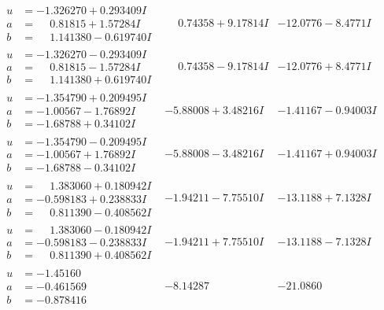 \documentclass[1p]{elsarticle_modified}
\theoremstyle{definition}
\begin{document}
$$\begin{array}{c|c|c}
\begin{aligned}
u &= -1.326270 + 0.293409 I \\
a &= \phantom{-}0.81815 + 1.57284 I \\
b &= \phantom{-}1.141380 - 0.619740 I\end{aligned}
 & \phantom{-}0.74358 + 9.17814 I & -12.0776 - 8.4771 I \\ \hline\begin{aligned}
u &= -1.326270 - 0.293409 I \\
a &= \phantom{-}0.81815 - 1.57284 I \\
b &= \phantom{-}1.141380 + 0.619740 I\end{aligned}
 & \phantom{-}0.74358 - 9.17814 I & -12.0776 + 8.4771 I \\ \hline\begin{aligned}
u &= -1.354790 + 0.209495 I \\
a &= -1.00567 - 1.76892 I \\
b &= -1.68788 + 0.34102 I\end{aligned}
 & -5.88008 + 3.48216 I & -1.41167 - 0.94003 I \\ \hline\begin{aligned}
u &= -1.354790 - 0.209495 I \\
a &= -1.00567 + 1.76892 I \\
b &= -1.68788 - 0.34102 I\end{aligned}
 & -5.88008 - 3.48216 I & -1.41167 + 0.94003 I \\ \hline\begin{aligned}
u &= \phantom{-}1.383060 + 0.180942 I \\
a &= -0.598183 + 0.238833 I \\
b &= \phantom{-}0.811390 - 0.408562 I\end{aligned}
 & -1.94211 - 7.75510 I & -13.1188 + 7.1328 I \\ \hline\begin{aligned}
u &= \phantom{-}1.383060 - 0.180942 I \\
a &= -0.598183 - 0.238833 I \\
b &= \phantom{-}0.811390 + 0.408562 I\end{aligned}
 & -1.94211 + 7.75510 I & -13.1188 - 7.1328 I \\ \hline\begin{aligned}
u &= -1.45160\phantom{ +0.000000I} \\
a &= -0.461569\phantom{ +0.000000I} \\
b &= -0.878416\phantom{ +0.000000I}\end{aligned}
 & -8.14287\phantom{ +0.000000I} & -21.0860\phantom{ +0.000000I} \\ \hline\begin{aligned}

\end{aligned}
\end{array}$$
\end{document}
